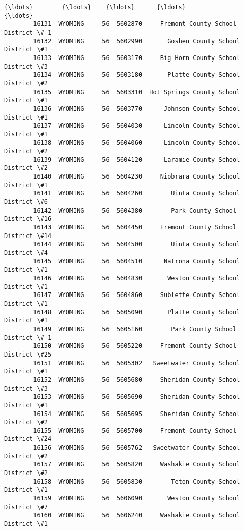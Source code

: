 \documentclass[11pt]{article}
\begin{document}
\begin{Verbatim}[commandchars=\\\{\}]
        {\ldots}        {\ldots}    {\ldots}      {\ldots}                                    {\ldots}   
        16131  WYOMING     56  5602870     Fremont County School District \# 1   
        16132  WYOMING     56  5602990       Goshen County School District \#1   
        16133  WYOMING     56  5603170     Big Horn County School District \#3   
        16134  WYOMING     56  5603180       Platte County School District \#2   
        16135  WYOMING     56  5603310  Hot Springs County School District \#1   
        16136  WYOMING     56  5603770      Johnson County School District \#1   
        16137  WYOMING     56  5604030      Lincoln County School District \#1   
        16138  WYOMING     56  5604060      Lincoln County School District \#2   
        16139  WYOMING     56  5604120      Laramie County School District \#2   
        16140  WYOMING     56  5604230     Niobrara County School District \#1   
        16141  WYOMING     56  5604260        Uinta County School District \#6   
        16142  WYOMING     56  5604380        Park County School District \#16   
        16143  WYOMING     56  5604450     Fremont County School District \#14   
        16144  WYOMING     56  5604500        Uinta County School District \#4   
        16145  WYOMING     56  5604510      Natrona County School District \#1   
        16146  WYOMING     56  5604830       Weston County School District \#1   
        16147  WYOMING     56  5604860     Sublette County School District \#1   
        16148  WYOMING     56  5605090       Platte County School District \#1   
        16149  WYOMING     56  5605160        Park County School District \# 1   
        16150  WYOMING     56  5605220     Fremont County School District \#25   
        16151  WYOMING     56  5605302   Sweetwater County School District \#1   
        16152  WYOMING     56  5605680     Sheridan County School District \#3   
        16153  WYOMING     56  5605690     Sheridan County School District \#1   
        16154  WYOMING     56  5605695     Sheridan County School District \#2   
        16155  WYOMING     56  5605700     Fremont County School District \#24   
        16156  WYOMING     56  5605762   Sweetwater County School District \#2   
        16157  WYOMING     56  5605820     Washakie County School District \#2   
        16158  WYOMING     56  5605830        Teton County School District \#1   
        16159  WYOMING     56  5606090       Weston County School District \#7   
        16160  WYOMING     56  5606240     Washakie County School District \#1   
        

\end{Verbatim}
\end{document}
